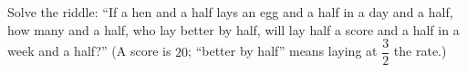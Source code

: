Solve the riddle: ``If a hen and a half lays an egg and a half in a day and a half, how many and a half, who lay better by half, will lay half a score and a half in a week and a half?'' (A score is $20$; ``better by half'' means laying at $\dfrac32$ the rate.)
